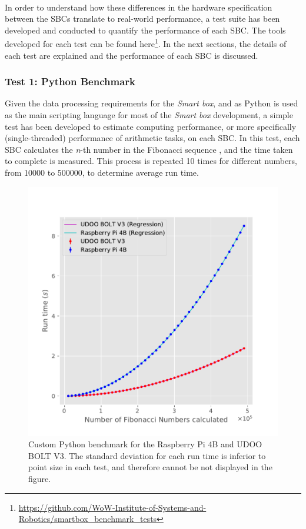 \paragraph{} In order to understand how these differences in the hardware specification between the \acs{SBC}s translate to real-world performance, a test suite has been developed and conducted to quantify the performance of each \acs{SBC}. The tools developed for each test can be found here\footnote{\url{https://github.com/WoW-Institute-of-Systems-and-Robotics/smartbox\_benchmark\_tests}}. In the next sections, the details of each test are explained and the performance of each \acs{SBC} is discussed. 

\subsubsection{Test 1: Python Benchmark}

Given the data processing requirements for the \textit{Smart box}, and as Python is used as the main scripting language for most of the \textit{Smart box} development, a simple test has been developed to estimate computing performance, or more specifically (single-threaded) performance of arithmetic tasks, on each \acs{SBC}. In this test, each \acs{SBC} calculates the \textit{n}-th number in the Fibonacci sequence \cite{pierce1951fibonacci}, and the time taken to complete is measured. This process is repeated 10 times for different numbers, from 10000 to 500000, to determine average run time.

\begin{figure}[H]
    \centering
    \includegraphics[width=0.67 \linewidth]{images/fibonacci-test.pdf}
    \caption [Custom Python benchmark for the Raspberry Pi 4B and UDOO BOLT V3.]{ Custom Python benchmark for the Raspberry Pi 4B and UDOO BOLT V3. The standard deviation for each run time is inferior to point size in each test, and therefore cannot be not displayed in the figure.}
    \label{fig:fibonacci-tests}
\end{figure}

